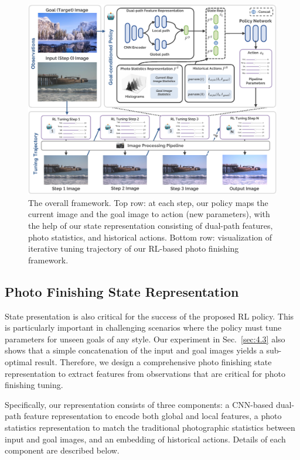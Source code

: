 \documentclass{article}
\begin{document}
\begin{figure}[t]
\centering
  \includegraphics[width=1.0\textwidth]{figures/framework_v7.pdf}
  \vspace{-15pt}
  \caption{The overall framework. Top row: at each step, our policy maps the current image and the goal image to action (new parameters), with the help of our state representation consisting of dual-path features, photo statistics, and historical actions. Bottom row: visualization of iterative tuning trajectory of our RL-based photo finishing framework.}
  \vspace{-15pt}
  \label{fig:framework}
\end{figure}

\vspace{-6pt}
\subsection{Photo Finishing State Representation}
\label{sec:3.3}
\vspace{-6pt}
State presentation is also critical for the success of the proposed RL policy. This is particularly important in challenging scenarios where the policy must tune parameters for unseen goals of any style. 
Our experiment in Sec.~\ref{sec:4.3} also shows that a simple concatenation of the input and goal images yields a sub-optimal result. Therefore, we design a comprehensive photo finishing state representation to extract features from observations that are critical for photo finishing tuning. 


Specifically, our representation consists of three components: a CNN-based dual-path feature representation to encode both global and local features, a photo statistics representation to match the traditional photographic statistics between input and goal images, and an embedding of historical actions. Details of each component are described below. 
\end{document}
